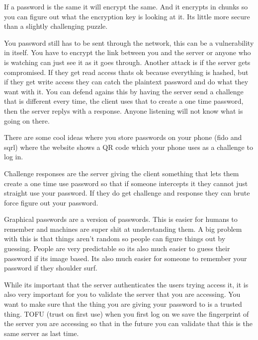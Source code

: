 \documentclass{article}
\begin{document}
\begin{itemizeP}

If a password is the same it will encrypt the same. And it encrypts in chunks so you can figure out what the encryption key is looking at it. Its little more secure than a slightly challenging puzzle.


You password still has to be sent through the network, this can be a vulnerability in itself. You have to encrypt the link between you and the server or anyone who is watching can just see it as it goes through. Another attack is if the server gets compromised. If they get read access thats ok because everything is hashed, but if they get write access they can catch the plaintext password and do what they want with it. You can defend agains this by having the server send a challenge that is different every time, the client uses that to create a one time password, then the server replys with a response. Anyone listening will not know what is going on there. 

There are some cool ideas where you store passwords on your phone (fido and sqrl) where the website shows a QR code which your phone uses as a challenge to log in.


Challenge responses are the server giving the client something that lets them create a one time use password so that if someone intercepts it they cannot just straight use your password. If they do get challenge and response they can brute force figure out your password.



Graphical passwords are a version of passwords. This is easier for humans to remember and machines are super shit at understanding them. A big problem with this is that things aren't random so people can figure things out by guessing. People are very predictable so its also much easier to guess their password if its image based. Its also much easier for someone to remember your password if they shoulder surf.


While its important that the server authenticates the users trying access it, it is also very important for you to validate the server that you are accessing. You want to make sure that the thing you are giving your password to is a trusted thing. TOFU (trust on first use) when you first log on we save the fingerprint of the server you are accessing so that in the future you can validate that this is the same server as last time.


\end{itemizeP}
\end{document}
